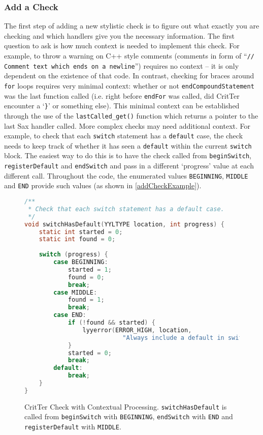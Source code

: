 \documentclass[12pt]{report}
\newcommand{\programName}{CritTer\xspace}
\begin{document}
\subsubsection{Add a Check}

The first step of adding a new stylistic check is to figure out what exactly you are checking and which 
handlers give you the necessary information. The first question to ask is how much context is needed to 
implement this check. For example, to throw a warning on C++ style comments (comments in form of 
``\lstinline{// Comment text which ends on a newline}'') requires no context -- it is only dependent on the 
existence of that code. In contrast, checking for braces around \lstinline{for} loops requires very minimal 
context: whether or not \lstinline{endCompoundStatement} was the last function called (i.e. right before 
\lstinline{endFor} was called, did \programName encounter a `\lstinline!}!' or something else). This 
minimal context can be established through the use of the \lstinline{lastCalled_get()} function which 
returns a pointer to the last Sax handler called. More complex checks may need additional context. For 
example, to check that each \lstinline{switch} statement has a \lstinline{default} case, the check needs to 
keep track of whether it has seen a \lstinline{default} within the current \lstinline{switch} block. The 
easiest way to do this is to have the check called from \lstinline{beginSwitch}, \lstinline{registerDefault} 
and \lstinline{endSwitch} and pass in a different `progress' value at each different call. Throughout the 
code, the enumerated values \lstinline{BEGINNING}, \lstinline{MIDDLE} and \lstinline{END} provide such 
values (as shown in \autoref{addCheckExample}).

\begin{figure}
\begin{lstlisting}[language=C]
/**
 * Check that each switch statement has a default case.
 */
void switchHasDefault(YYLTYPE location, int progress) {
	static int started = 0;
	static int found = 0;
	
	switch (progress) {
		case BEGINNING:
			started = 1;
			found = 0;
			break;
		case MIDDLE:
			found = 1;
			break;
		case END:
			if (!found && started) {
				lyyerror(ERROR_HIGH, location, 
					       "Always include a default in switch statements");
			}
			started = 0;
			break;
		default: 
			break;
	}
}
\end{lstlisting}
\caption[\programName Check with Contextual Processing]{\programName Check with Contextual Processing. \lstinline{switchHasDefault} is called from \lstinline{beginSwitch} with \lstinline{BEGINNING}, \lstinline{endSwitch} with \lstinline{END} and \lstinline{registerDefault} with \lstinline{MIDDLE}.}
\label{addCheckExample}
\end{figure}
\end{document}
